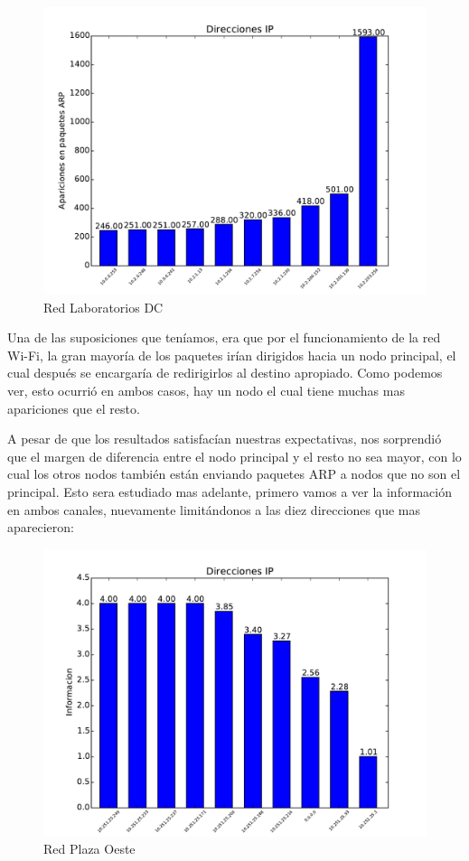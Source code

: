 \begin{figure}[H]
\begin{center}
\includegraphics[width=0.8\columnwidth]{graficos/dc_top_s2.pdf}
\caption{Red Laboratorios DC}
\end{center}
\end{figure}

Una de las suposiciones que teníamos, era que por el funcionamiento de la red Wi-Fi, la gran mayoría de los paquetes irían dirigidos hacia un nodo principal, el cual después se encargaría de redirigirlos al destino apropiado. Como podemos ver, esto ocurrió en ambos casos, hay un nodo el cual tiene muchas mas apariciones que el resto.

A pesar de que los resultados satisfacían nuestras expectativas, nos sorprendió que el margen de diferencia entre el nodo principal y el resto no sea mayor, con lo cual los otros nodos también están enviando paquetes ARP a nodos que no son el principal. Esto sera estudiado mas adelante, primero vamos a ver la información en ambos canales, nuevamente limitándonos a las diez direcciones que mas aparecieron:

\begin{figure}[H]
\begin{center}
\includegraphics[width=0.8\columnwidth]{graficos/plaza_top_inf_s2.pdf}
\caption{Red Plaza Oeste}
\end{center}
\end{figure}

